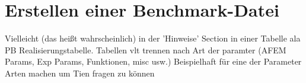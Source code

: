 %
%
%
%
%
%
%
%
%
%


\section{Erstellen einer Benchmark-Datei}
Vielleicht (das heißt wahrscheinlich) in der 'Hinweise' Section in einer
Tabelle ala PB Realisierungstabelle. Tabellen vlt trennen nach Art der paramter
(AFEM Params, Exp Params, Funktionen, misc usw.)
Beispielhaft für eine der Parameter Arten machen um Tien fragen zu können


